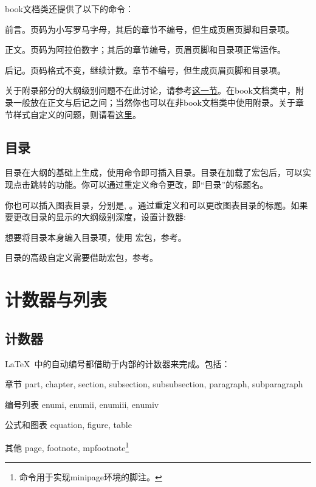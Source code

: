 book文档类还提供了以下的命令：
\begin{para}
\item[\latexline{frontmatter}] 前言。页码为小写罗马字母，其后的章节不编号，但生成页眉页脚和目录项。
\item[\latexline{mainmatter}] 正文。页码为阿拉伯数字；其后的章节编号，页眉页脚和目录项正常运作。
\item[\latexline{backmatter}] 后记。页码格式不变，继续计数。章节不编号，但生成页眉页脚和目录项。
\end{para}

关于附录部分的大纲级别问题不在此讨论，请参考\hyperref[sec:appendix]{这一节}。在book文档类中，附录一般放在正文与后记之间；当然你也可以在非book文档类中使用附录。关于章节样式自定义的问题，则请看\hyperref[sec:titlesec]{这里}。

\subsection{目录}
目录在大纲的基础上生成，使用命令即可插入目录。目录在加载了宏包后，可以实现点击跳转的功能。你可以通过重定义命令更改，即“目录”的标题名。
\begin{latex}
\renewcommand{\contensname}{目录}
\end{latex}

你也可以插入图表目录，分别是, 。通过重定义和可以更改图表目录的标题。如果要更改目录的显示的大纲级别深度，设置计数器:
\begin{latex}
\setcounter{tocdepth}{2} %
\end{latex}

想要将目录本身编入目录项，使用  宏包，参考\pageref{pkg:tocbibind}。

目录的高级自定义需要借助宏包，参考。

\section{计数器与列表}

\subsection{计数器}
\LaTeX\ 中的自动编号都借助于内部的计数器来完成。包括：
\begin{fead}
\item[章节] part, chapter, section, subsection, subsubsection, paragraph, subparagraph
\item[编号列表] enumi, enumii, enumiii, enumiv
\item[公式和图表] equation, figure, table
\item[其他] page, footnote, mpfootnote\footnote{命令用于实现minipage环境的脚注。}
\end{fead}

